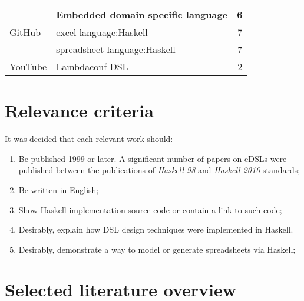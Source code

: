 \begin{longtable}{|l|l|r|}
                                   & Embedded domain specific language         &
    6                                                                                                     \\
    \hline
    GitHub
                                   & excel language:Haskell                    & 7                        \\
                                   & spreadsheet language:Haskell              & 7                        \\
    \hline
    YouTube
                                   & Lambdaconf DSL                            & 2                        \\
    \hline
\end{longtable}

\section{Relevance criteria} \label {sec:relevance}

It was decided that each relevant work should:

\begin{enumerate}[noitemsep, label=\arabic*) ]
    \item Be published 1999 or later. A significant number of papers on eDSLs were published between the publications of \textit{Haskell 98} and \textit{Haskell 2010} standards;
    \item Be written in English;
    \item Show Haskell implementation source code or contain a link to such code;
    \item Desirably, explain how DSL design techniques were implemented in Haskell.
    \item Desirably, demonstrate a way to model or generate spreadsheets via Haskell;
\end{enumerate}

\section{Selected literature overview} \label{sec:selectedLiterature}
